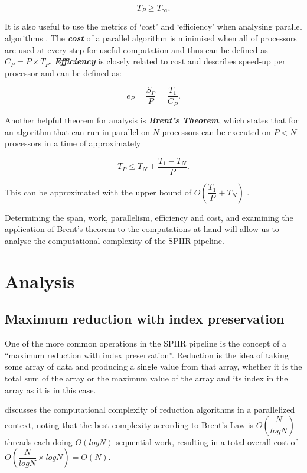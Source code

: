 \documentclass{article}
\begin{document}
\[
    T_P \geq T_\infty.
\]

It is also useful to use the metrics of `cost' and `efficiency' when analysing parallel algorithms \cite{brent}.
The \textit{\textbf{cost}} of a parallel algorithm is minimised when all of processors are used at every step for useful computation and thus can be defined as \(C_P = P\times{T_P}\).
\textit{\textbf{Efficiency}} is closely related to cost and describes speed-up per processor and can be defined as:

\[
    e_P = \dfrac{S_P}{P} = \dfrac{T_1}{C_P}.
\]

Another helpful theorem for analysis is \textit{\textbf{Brent's Theorem}}, which states that for an algorithm that can run in parallel on \(N\) processors can be executed on \(P < N\) processors in a time of approximately \cite{BrentsLaw}

\[
    T_P \leq T_N + \dfrac{T_1-T_N}{P}.
\]

This can be approximated with the upper bound of \(O(\dfrac{T_1}{P} + T_N)\) \cite{brent}.

Determining the span, work, parallelism, efficiency and cost, and examining the application of Brent's theorem to the computations at hand will allow us to analyse the computational complexity of the SPIIR pipeline.

\section{Analysis} \label{sec:analysis}
\subsection{Maximum reduction with index preservation} \label{sec:reduce}

One of the more common operations in the SPIIR pipeline is the concept of a ``maximum reduction with index preservation''.
Reduction is the idea of taking some array of data and producing a single value from that array, whether it is the total sum of the array or the maximum value of the array and its index in the array as it is in this case.

\cite{reduction} discusses the computational complexity of reduction algorithms in a parallelized context, noting that the best complexity according to Brent's Law is \(O(\dfrac{N}{log N})\) threads each doing \(O(log N)\) sequential work, resulting in a total overall cost of \(O(\dfrac{N}{log N}\times{log N}) = O(N)\).
\end{document}
